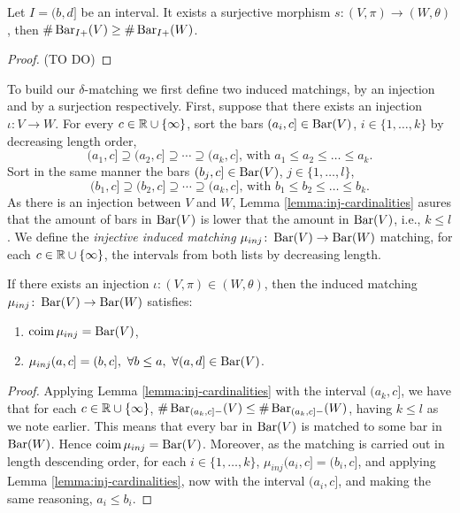 \begin{lemma} \cite[Exercise 3.1.3]{polterovich} \label{lemma:sur-cardinalities}
    Let $ I = (b, d] $ be an interval. It exists a surjective morphism $s\colon (V, \pi) \to (W, \theta) $, then $\# \operatorname{Bar}_{I+}(V) \geq \# \operatorname{Bar}_{I+}(W) $.
\end{lemma}
\begin{proof} (TO DO)
    
\end{proof}

To build our $\delta$-matching we first define two induced matchings, by an injection and by a surjection respectively. First, suppose that there exists an injection $\iota \colon V \to W$. For every $ c \in \mathbb R \cup \{\infty\}$, sort the bars $(a_i, c] \in \operatorname{Bar}(V) $, $i \in \{1, \dots, k\} $ by decreasing length order,
$$
    (a_1, c] \supseteq (a_2, c] \supseteq \cdots \supseteq (a_k, c] \text{, with } a_1 \leq a_2 \leq \dots \leq a_k.
$$
Sort in the same manner the bars $(b_j, c] \in \operatorname{Bar}(V) $, $j \in \{1, \dots, l\} $,
$$
    (b_1, c] \supseteq (b_2, c] \supseteq \cdots \supseteq (a_k, c] \text{, with } b_1 \leq b_2 \leq \dots \leq b_k.
$$
As there is an injection between $ V $ and $ W$, Lemma \ref{lemma:inj-cardinalities} asures that the amount of bars in $ \operatorname{Bar}(V) $ is lower that the amount in $ \operatorname{Bar}(V) $, i.e., $ k \leq l $. We define the {\it injective induced matching} $\mu_{inj}\colon \operatorname{Bar}(V) \to \operatorname{Bar}(W) $ matching, for each $ c \in \mathbb R \cup \{\infty\} $, the intervals from both lists by decreasing length.

\begin{lemma} \cite[Proposition 3.1.5]{polterovich} \label{lemma:inj-matching}
    If there exists an injection $\iota\colon (V, \pi) \in (W, \theta) $, then the induced matching $ \mu_{inj}\colon \operatorname{Bar}(V) \to \operatorname{Bar} (W) $ satisfies:
    \begin{enumerate}
        \item $\operatorname{coim} \mu_{inj} = \operatorname{Bar}(V)$, \label{prop:3.1.5. 1}
        \item $\mu_{inj}(a, c] = (b, c], \ \forall b \leq a, \ \forall (a, d] \in \operatorname{Bar}(V)$.
    \end{enumerate}
\end{lemma}
\begin{proof}
    Applying Lemma \ref{lemma:inj-cardinalities} with the interval $ (a_k, c] $, we have that for each $ c \in \mathbb R \cup \{\infty\} $, $ \# \operatorname{Bar}_{(a_k, c]-}(V) \leq \# \operatorname{Bar}_{(a_k, c]-}(W) $, having $ k \leq l $ as we note earlier. This means that every bar in $\operatorname{Bar}(V)$ is matched to some bar in $\operatorname{Bar}(W)$. Hence $\operatorname{coim} \mu_{inj} = \operatorname{Bar}(V)$. Moreover, as the matching is carried out in length descending order, for each $ i \in \{1, \dots, k\} $, $\mu_{inj}(a_i, c] = (b_i, c]$, and applying Lemma \ref{lemma:inj-cardinalities}, now with the interval $ (a_i, c] $, and making the same reasoning, $ a_i \leq b_i $.
\end{proof}

